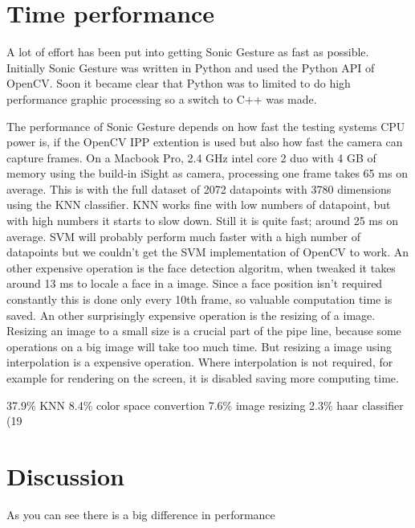 \section{Time performance}
A lot of effort has been put into getting Sonic Gesture as fast as possible. Initially Sonic Gesture was written in Python and used the Python API of OpenCV. Soon it became clear that Python was to limited to do high performance graphic processing so a switch to C++ was made. 

The performance of Sonic Gesture depends on how fast the testing systems CPU power is, if the OpenCV IPP extention is used but also how fast the camera can capture frames. On a Macbook Pro, 2.4 GHz intel core 2 duo with 4 GB of memory using the build-in iSight as camera, processing one frame takes 65 ms on average. This is with the full dataset of 2072 datapoints with 3780 dimensions using the KNN classifier. KNN works fine with low numbers of datapoint, but with high numbers it starts to slow down. Still it is quite fast; around 25 ms on average. SVM will probably perform much faster with a high number of datapoints but we couldn't get the SVM implementation of OpenCV to work. An other expensive operation is the face detection algoritm, when tweaked it takes around 13 ms to locale a face in a image. Since a face position isn't required constantly this is done only every 10th frame, so valuable computation time is saved. An other surprisingly expensive operation is the resizing of a image. Resizing an image to a small size is a crucial part of the pipe line, because some operations on a big image will take too much time. But resizing a image using interpolation is a expensive operation. Where interpolation is not required, for example for rendering on the screen, it is disabled saving more computing time. 

37.9\% KNN
8.4\% color space convertion
7.6\% image resizing
2.3\% haar classifier (19%

\section{Discussion}
As you can see there is a big difference in performance



